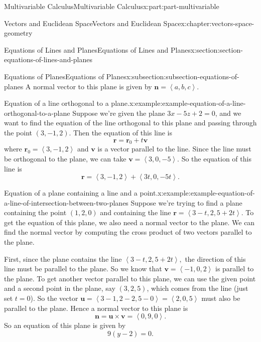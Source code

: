 \documentclass[twoside,10pt,]{tufte-book}
\numberwithin{equation}{part}
\newcommand{\dotprod}[1]{\left\langle #1 \right\rangle}
\begin{document}
\begin{partptx}{Multivariable Calculus}{}{Multivariable Calculus}{}{}{x:part:part-multivariable}
\begin{chapterptx}{Vectors and Euclidean Space}{}{Vectors and Euclidean Space}{}{}{x:chapter:vectors-space-geometry}
\begin{sectionptx}{Equations of Lines and Planes}{}{Equations of Lines and Planes}{}{}{x:section:section-equations-of-lines-and-planes}
\begin{subsectionptx}{Equations of Planes}{}{Equations of Planes}{}{}{x:subsection:subsection-equations-of-planes}
A normal vector to this plane is given by \(\mathbf{n} = \dotprod{a,b,c}\).%
\begin{example}{Equation of a line orthogonal to a plane.}{x:example:example-equation-of-a-line-orthogonal-to-a-plane}%
Suppose we're given the plane \(3x-5z+2 = 0\), and we want to find the equation of the line orthogonal to this plane and passing through the point \((3,-1,2)\). Then the equation of this line is%
%
\begin{equation*}
\mathbf{r} = \mathbf{r}_{0}+t\mathbf{v}
\end{equation*}
where \(\mathbf{r}_{0} = \dotprod{3,-1,2}\) and \(\mathbf{v}\) is a vector parallel to the line. Since the line must be orthogonal to the plane, we can take \(\mathbf{v} = \dotprod{3,0,-5}\). So the equation of this line is%
%
\begin{equation*}
\mathbf{r} = \dotprod{3,-1,2}+\dotprod{3t,0,-5t}.
\end{equation*}
\end{example}
\begin{example}{Equation of a plane containing a line and a point.}{x:example:example-equation-of-a-line-of-intersection-between-two-planes}%
Suppose we're trying to find a plane containing the point \((1,2,0)\) and containing the line \(\mathbf{r} = \dotprod{3-t,2,5+2t}\). To get the equation of this plane, we also need a normal vector to the plane. We can find the normal vector by computing the cross product of two vectors parallel to the plane.%
\par
First, since the plane contains the line \(\dotprod{3-t,2,5+2t},\) the direction of this line must be parallel to the plane. So we know that \(\mathbf{v} = \dotprod{-1,0,2}\) is parallel to the plane. To get another vector parallel to this plane, we can use the given point and a second point in the plane, say \((3,2,5)\), which comes from the line (just set \(t=0\)). So the vector \(\mathbf{u} = \dotprod{3-1,2-2,5-0} = \dotprod{2,0,5}\) must also be parallel to the plane. Hence a normal vector to this plane is%
%
\begin{equation*}
\mathbf{n} = \mathbf{u}\times\mathbf{v} = \dotprod{0,9,0}.
\end{equation*}
So an equation of this plane is given by%
%
\begin{equation*}
9(y-2) = 0.
\end{equation*}
\end{example}
\end{subsectionptx}
\end{sectionptx}

\end{chapterptx}
\end{partptx}
\end{document}
